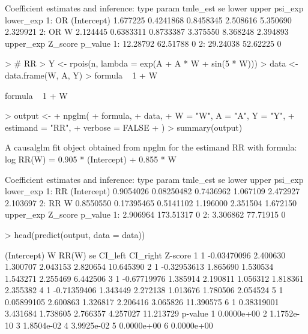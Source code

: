 \documentclass[article]{jss}
\begin{document}
\begin{Schunk}
\begin{Soutput}
Coefficient estimates and inference:
   type       param tmle_est        se     lower    upper  psi_exp lower_exp
1:   OR (Intercept) 1.677225 0.4241868 0.8458345 2.508616 5.350690  2.329921
2:   OR           W 2.124445 0.6383311 0.8733387 3.375550 8.368248  2.394893
   upper_exp  Z_score p_value
1:  12.28792 62.51788       0
2:  29.24038 52.62225       0
\end{Soutput}
\begin{Sinput}
> # RR
> Y <- rpois(n, lambda = exp(A + A * W + sin(5 * W)))
> data <- data.frame(W, A, Y)
> formula ~ 1 + W
\end{Sinput}
\begin{Soutput}
formula ~ 1 + W
\end{Soutput}
\begin{Sinput}
> output <-
+   npglm(
+     formula,
+     data,
+     W = "W", A = "A", Y = "Y",
+     estimand = "RR",
+     verbose = FALSE
+   )
> summary(output)
\end{Sinput}
\begin{Soutput}
A causalglm fit object obtained from npglm for the estimand RR with formula: 
log RR(W) = 0.905 * (Intercept) + 0.855 * W

Coefficient estimates and inference:
   type       param  tmle_est         se     lower    upper  psi_exp lower_exp
1:   RR (Intercept) 0.9054026 0.08250482 0.7436962 1.067109 2.472927  2.103697
2:   RR           W 0.8550550 0.17395465 0.5141102 1.196000 2.351504  1.672150
   upper_exp   Z_score p_value
1:  2.906964 173.51317       0
2:  3.306862  77.71915       0
\end{Soutput}
\begin{Sinput}
> head(predict(output, data = data))
\end{Sinput}
\begin{Soutput}
  (Intercept)           W    RR(W)       se  CI_left CI_right   Z-score
1           1 -0.03470096 2.400630 1.300707 2.043153 2.820654 10.645390
2           1 -0.32953613 1.865690 1.530534 1.543271 2.255469  6.442506
3           1 -0.67719976 1.385914 2.190811 1.056312 1.818361  2.355382
4           1 -0.71359406 1.343449 2.272138 1.013676 1.780506  2.054524
5           1  0.05899105 2.600863 1.326817 2.206416 3.065826 11.390575
6           1  0.38319001 3.431684 1.738605 2.766357 4.257027 11.213729
     p-value
1 0.0000e+00
2 1.1752e-10
3 1.8504e-02
4 3.9925e-02
5 0.0000e+00
6 0.0000e+00
\end{Soutput}
\end{Schunk}
\end{document}
